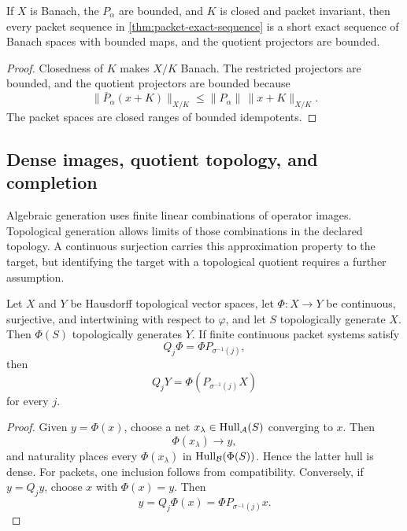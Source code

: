 \begin{corollary}
\label{cor:topological-packet-exact-sequence}
If $X$ is Banach, the $P_\alpha$ are bounded, and $K$ is closed and packet invariant, then every packet sequence in \cref{thm:packet-exact-sequence} is a short exact sequence of Banach spaces with bounded maps, and the quotient projectors are bounded.
\end{corollary}

\begin{proof}
Closedness of $K$ makes $X/K$ Banach.  The restricted projectors are bounded, and the quotient projectors are bounded because
\[
\|\overline P_\alpha(x+K)\|_{X/K}
\leq
\|P_\alpha\|\,\|x+K\|_{X/K}.
\]
The packet spaces are closed ranges of bounded idempotents.
\end{proof}

\subsection{Dense images, quotient topology, and completion}
Algebraic generation uses finite linear combinations of operator images.  Topological generation allows limits of those combinations in the declared topology.  A continuous surjection carries this approximation property to the target, but identifying the target with a topological quotient requires a further assumption.

\begin{theorem}
\label{thm:dense-realization}
Let $X$ and $Y$ be Hausdorff topological vector spaces, let $\Phi:X\to Y$ be continuous, surjective, and intertwining with respect to $\varphi$, and let $S$ topologically generate $X$.  Then $\Phi(S)$ topologically generates $Y$.  If finite continuous packet systems satisfy
\[
Q_j\Phi=\Phi P_{\sigma^{-1}(j)},
\]
then
\[
\boxed{
Q_jY=\Phi(P_{\sigma^{-1}(j)}X)
}
\]
for every $j$.
\end{theorem}

\begin{proof}
Given $y=\Phi(x)$, choose a net $x_\lambda\in\operatorname{Hull}_{\mathcal A}(S)$ converging to $x$.  Then
\[
\Phi(x_\lambda)\to y,
\]
and naturality places every $\Phi(x_\lambda)$ in $\operatorname{Hull}_{\mathcal B}(\Phi(S))$.  Hence the latter hull is dense.  For packets, one inclusion follows from compatibility.  Conversely, if $y=Q_jy$, choose $x$ with $\Phi(x)=y$.  Then
\[
y=Q_j\Phi(x)=\Phi P_{\sigma^{-1}(j)}x.
\]
\end{proof}

